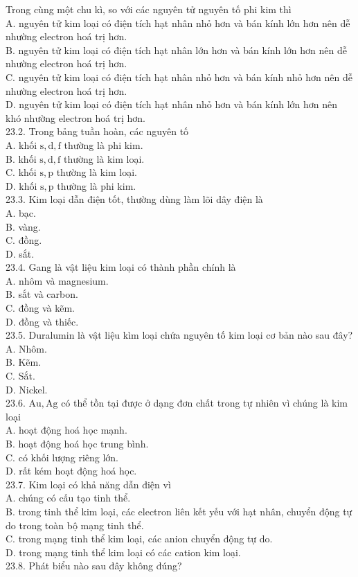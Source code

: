 \documentclass[10pt]{article}
\begin{document}
Trong cùng một chu kì, so với các nguyên tử nguyên tố phi kim thì\\
A. nguyên tử kim loại có điện tích hạt nhân nhỏ hơn và bán kính lớn hơn nên dễ nhường electron hoá trị hơn.\\
B. nguyên tử kim loại có điện tích hạt nhân lớn hơn và bán kính lớn hơn nên dễ nhường electron hoá trị hơn.\\
C. nguyên tử kim loại có điện tích hạt nhân nhỏ hơn và bán kính nhỏ hơn nên dễ nhường electron hoá trị hơn.\\
D. nguyên tử kim loại có điện tích hạt nhân nhỏ hơn và bán kính lớn hơn nên khó nhường electron hoá trị hơn.\\
23.2. Trong bảng tuần hoàn, các nguyên tố\\
A. khối $\mathrm{s}, \mathrm{d}, \mathrm{f}$ thường là phi kim.\\
B. khối $\mathrm{s}, \mathrm{d}, \mathrm{f}$ thường là kim loại.\\
C. khối $\mathrm{s}, \mathrm{p}$ thường là kim loại.\\
D. khối $\mathrm{s}, \mathrm{p}$ thường là phi kim.\\
23.3. Kim loại dẫn điện tốt, thường dùng làm lõi dây điện là\\
A. bạc.\\
B. vàng.\\
C. đồng.\\
D. sắt.\\
23.4. Gang là vật liệu kim loại có thành phần chính là\\
A. nhôm và magnesium.\\
B. sắt và carbon.\\
C. đồng và kẽm.\\
D. đồng và thiếc.\\
23.5. Duralumin là vật liệu kìm loại chứa nguyên tố kim loại cơ bản nào sau đây?\\
A. Nhôm.\\
B. Kẽm.\\
C. Sắt.\\
D. Nickel.\\
23.6. $\mathrm{Au}, \mathrm{Ag}$ có thể tồn tại được ở dạng đơn chất trong tự nhiên vì chúng là kim loại\\
A. hoạt động hoá học mạnh.\\
B. hoạt động hoá học trung bình.\\
C. có khối lượng riêng lớn.\\
D. rất kém hoạt động hoá học.\\
23.7. Kim loại có khả năng dẫn điện vì\\
A. chúng có cấu tạo tinh thể.\\
B. trong tinh thể kim loại, các electron liên kết yếu với hạt nhân, chuyển động tự do trong toàn bộ mạng tinh thể.\\
C. trong mạng tinh thể kim loại, các anion chuyển động tự do.\\
D. trong mạng tinh thể kim loại có các cation kim loại.\\
23.8. Phát biểu nào sau đây không đúng?
\end{document}
